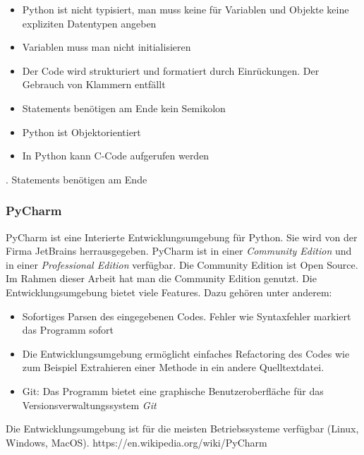\begin{itemize}
\item Python ist nicht typisiert, man muss keine für Variablen und Objekte keine expliziten Datentypen angeben
\item Variablen muss man nicht initialisieren
\item Der Code wird strukturiert und formatiert durch Einrückungen. Der Gebrauch von Klammern entfällt
\item Statements benötigen am Ende kein Semikolon
\item Python ist Objektorientiert
\item In Python kann C-Code aufgerufen werden
\end{itemize} . Statements benötigen am Ende 





\subsubsection{PyCharm}   
PyCharm ist eine Interierte Entwicklungsumgebung für Python. Sie wird von der Firma JetBrains herrausgegeben. PyCharm ist in einer \textit{Community Edition} und in einer \textit{Professional Edition} verfügbar. Die Community Edition ist Open Source. Im Rahmen dieser Arbeit hat man die Community Edition genutzt. Die Entwicklungsumgebung bietet viele Features. Dazu gehören unter anderem:
\begin{itemize}
\item Sofortiges Parsen des eingegebenen Codes. Fehler wie Syntaxfehler markiert das Programm sofort
\item Die Entwicklungsumgebung ermöglicht einfaches Refactoring des Codes wie zum Beispiel Extrahieren einer Methode in ein andere Quelltextdatei.
\item Git: Das Programm bietet eine graphische Benutzeroberfläche für das Versionsverwaltungssystem \textit{Git} 
\end{itemize} 
Die Entwicklungsumgebung ist für die meisten Betriebssysteme verfügbar (Linux, Windows, MacOS).
https://en.wikipedia.org/wiki/PyCharm 






          
 
